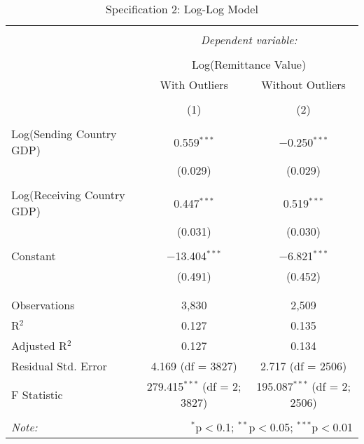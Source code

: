 
\begin{table}[!htbp] \centering 
  \caption{Specification 2: Log-Log Model} 
  \label{} 
\begin{tabular}{@{\extracolsep{5pt}}lcc} 
\\[-1.8ex]\hline 
\hline \\[-1.8ex] 
 & \multicolumn{2}{c}{\textit{Dependent variable:}} \\ 
\cline{2-3} 
\\[-1.8ex] & \multicolumn{2}{c}{Log(Remittance Value)} \\ 
 & With Outliers & Without Outliers \\ 
\\[-1.8ex] & (1) & (2)\\ 
\hline \\[-1.8ex] 
 Log(Sending Country GDP) & 0.559$^{***}$ & $-$0.250$^{***}$ \\ 
  & (0.029) & (0.029) \\ 
  & & \\ 
 Log(Receiving Country GDP) & 0.447$^{***}$ & 0.519$^{***}$ \\ 
  & (0.031) & (0.030) \\ 
  & & \\ 
 Constant & $-$13.404$^{***}$ & $-$6.821$^{***}$ \\ 
  & (0.491) & (0.452) \\ 
  & & \\ 
\hline \\[-1.8ex] 
Observations & 3,830 & 2,509 \\ 
R$^{2}$ & 0.127 & 0.135 \\ 
Adjusted R$^{2}$ & 0.127 & 0.134 \\ 
Residual Std. Error & 4.169 (df = 3827) & 2.717 (df = 2506) \\ 
F Statistic & 279.415$^{***}$ (df = 2; 3827) & 195.087$^{***}$ (df = 2; 2506) \\ 
\hline 
\hline \\[-1.8ex] 
\textit{Note:}  & \multicolumn{2}{r}{$^{*}$p$<$0.1; $^{**}$p$<$0.05; $^{***}$p$<$0.01} \\ 
\end{tabular} 
\end{table} 
